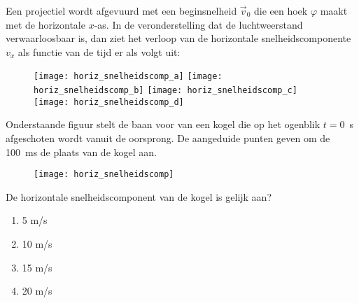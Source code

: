 \documentclass{ximera}
\begin{document}
\begin{exercise} Een projectiel wordt afgevuurd met een beginsnelheid
$\vec{v}_0$ die een hoek $\varphi$ maakt met de horizontale
\mbox{$x$-as}.
In de veronderstelling dat de luchtweerstand verwaarloosbaar is, dan
ziet het verloop van de horizontale snelheidscomponente $v_x$ als
functie van de tijd er als volgt uit:
\begin{figure}[h]
\begin{flushright}
\texttt{[image: horiz\_snelheidscomp\_a]}
\texttt{[image: horiz\_snelheidscomp\_b]}
\texttt{[image: horiz\_snelheidscomp\_c]}
\texttt{[image: horiz\_snelheidscomp\_d]}
\end{flushright}
\end{figure}

\end{exercise}

\begin{exercise} Onderstaande figuur stelt de baan voor van
een kogel die op het ogenblik \mbox{$t=0$~s} afgeschoten wordt
vanuit de oorsprong. De aangeduide punten geven om de \mbox{100 ms}
de plaats van de kogel aan.
\begin{figure}[h]
\begin{center}
\texttt{[image: horiz\_snelheidscomp]}
\end{center}
\end{figure}


De horizontale snelheidscomponent van de kogel is gelijk aan?
\begin{enumerate}
\item 5 m/s
\item 10 m/s
\item 15 m/s
\item 20 m/s
\end{enumerate}

\end{exercise}
\end{document}
